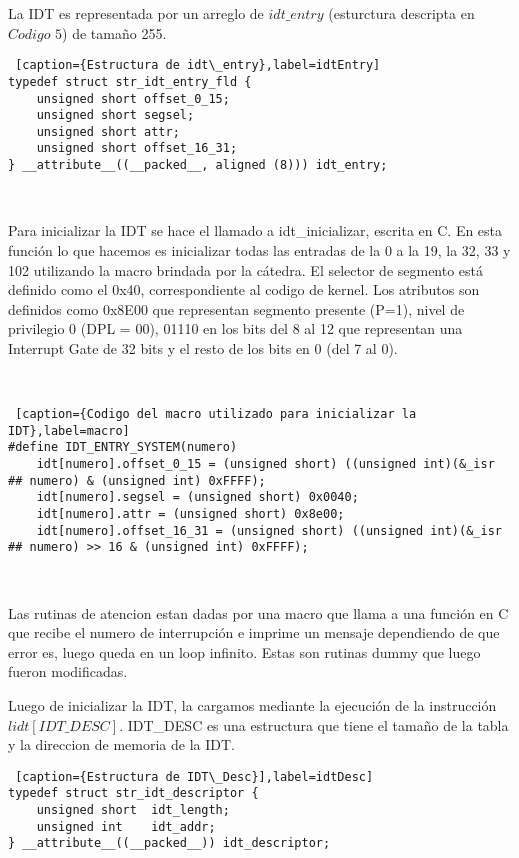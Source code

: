 \par{La IDT es representada por un arreglo de $idt\_entry$ (esturctura descripta en $Codigo$ $5$) de tamaño 255.}
\\
\begin{lstlisting} [caption={Estructura de idt\_entry},label=idtEntry]
typedef struct str_idt_entry_fld {
    unsigned short offset_0_15;
    unsigned short segsel;
    unsigned short attr;
    unsigned short offset_16_31;
} __attribute__((__packed__, aligned (8))) idt_entry;

\end{lstlisting}

\\
\par{Para inicializar la IDT se hace el llamado a idt\_inicializar, escrita en C. En esta funci\'on lo que hacemos es inicializar todas las entradas de la 0 a la 19, la 32, 33 y 102 utilizando la macro brindada por la c\'atedra. El selector de segmento est\'a definido como el 0x40, correspondiente al codigo de kernel. Los atributos son definidos como 0x8E00 que representan segmento presente (P=1), nivel de privilegio 0 (DPL = 00), 01110 en los bits del 8 al 12 que representan una Interrupt Gate de 32 bits y el resto de los bits en 0 (del 7 al 0).} 

\\
\begin{lstlisting} [caption={Codigo del macro utilizado para inicializar la IDT},label=macro]
#define IDT_ENTRY_SYSTEM(numero)                                                                                        
    idt[numero].offset_0_15 = (unsigned short) ((unsigned int)(&_isr ## numero) & (unsigned int) 0xFFFF);        
    idt[numero].segsel = (unsigned short) 0x0040;                                                                
    idt[numero].attr = (unsigned short) 0x8e00;                                                                  
    idt[numero].offset_16_31 = (unsigned short) ((unsigned int)(&_isr ## numero) >> 16 & (unsigned int) 0xFFFF);
\end{lstlisting}

\\

\par{Las rutinas de atencion estan dadas por una macro que llama a una funci\'on en C que recibe el numero de interrupci\'on e imprime un mensaje dependiendo de que error es, luego queda en un loop infinito. Estas son rutinas dummy que luego fueron modificadas.}
\par{Luego de inicializar la IDT, la cargamos mediante la ejecuci\'on de la instrucci\'on $lidt[IDT\_DESC]$. IDT\_DESC es una estructura que tiene el tamaño de la tabla y la direccion de memoria de la IDT.}

\begin{lstlisting} [caption={Estructura de IDT\_Desc}],label=idtDesc] 
typedef struct str_idt_descriptor {
    unsigned short  idt_length;
    unsigned int    idt_addr;
} __attribute__((__packed__)) idt_descriptor;
\end{lstlisting}
